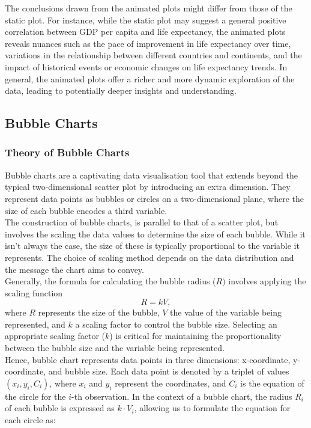 \documentclass{article}\usepackage[]{graphicx}\usepackage[]{xcolor}
\numberwithin{equation}{section}
\begin{document}
\noindent The conclusions drawn from the animated plots might differ from those of the static plot. For instance, while the static plot may suggest a general positive correlation between GDP per capita and life expectancy, the animated plots reveals nuances such as the pace of improvement in life expectancy over time, variations in the relationship between different countries and continents, and the impact of historical events or economic changes on life expectancy trends. In general, the animated plots offer a richer and more dynamic exploration of the data, leading to potentially deeper insights and understanding.

\subsection{Bubble Charts}
\subsubsection{Theory of Bubble Charts}
\noindent Bubble charts are a captivating data visualisation tool that extends beyond the typical two-dimensional scatter plot by introducing an extra dimension. They represent data points as bubbles or circles on a two-dimensional plane, where the size of each bubble encodes a third variable.\\

\noindent The construction of bubble charts, is parallel to that of a scatter plot, but involves the scaling the data values to determine the size of each bubble. While it isn't always the case, the size of these is typically proportional to the variable it represents. The choice of scaling method depends on the data distribution and the message the chart aims to convey.\\

\noindent Generally, the formula for calculating the bubble radius (\(R)\) involves applying the scaling function
\[
R = kV,
\]
\noindent where \(R\) represents the size of the bubble, \(V\) the value of the variable being represented, and \(k\) a scaling factor to control the bubble size. Selecting an appropriate scaling factor (\(k\)) is critical for maintaining the proportionality between the bubble size and the variable being represented.\\ 

\noindent Hence, bubble chart represents data points in three dimensions: x-coordinate, y-coordinate, and bubble size. Each data point is denoted by a triplet of values \((x_i, y_i, C_i)\), where \(x_i\) and \(y_i\) represent the coordinates, and \(C_i\) is the equation of the circle for the \(i\)-th observation. In the context of a bubble chart, the radius \(R_i\) of each bubble is expressed as \(k \cdot V_i\), allowing us to formulate the equation for each circle as:
\end{document}
